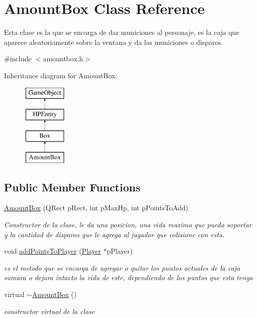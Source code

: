 \hypertarget{class_amount_box}{\section{Amount\-Box Class Reference}
\label{class_amount_box}
}


Esta clase es la que se encarga de dar municiones al personaje, es la caja que aparece aleatoriamente sobre la ventana y da las municiones o disparos.  




{\ttfamily \#include $<$amountbox.\-h$>$}

Inheritance diagram for Amount\-Box\-:\begin{figure}[H]
\begin{center}
\leavevmode
\includegraphics[height=4.000000cm]{class_amount_box}
\end{center}
\end{figure}
\subsection*{Public Member Functions}
\begin{DoxyCompactItemize}
\item 
\hyperlink{class_amount_box_a19f89bb62420a75212487fd191f256c4}{Amount\-Box} (Q\-Rect p\-Rect, int p\-Max\-Hp, int p\-Points\-To\-Add)
\begin{DoxyCompactList}\small\item\em Constructor de la clase, le da una posicion, una vida maxima que pueda soportar y la cantidad de disparos que le agrega al jugador que colisione con esta. \end{DoxyCompactList}\item 
void \hyperlink{class_amount_box_a006ae7739b2e6dbbb19c0a2a09936a71}{add\-Points\-To\-Player} (\hyperlink{class_player}{Player} $\ast$p\-Player)
\begin{DoxyCompactList}\small\item\em es el metodo que se encarga de agregar o quitar los puntos actuales de la caja sumara o dejara intacto la vida de este, dependiendo de los puntos que esta tenga \end{DoxyCompactList}\item 
\hypertarget{class_amount_box_a4d6ec95818bed923b6c19e1df6b50db8}{virtual \hyperlink{class_amount_box_a4d6ec95818bed923b6c19e1df6b50db8}{$\sim$\-Amount\-Box} ()}\label{class_amount_box_a4d6ec95818bed923b6c19e1df6b50db8}

\begin{DoxyCompactList}\small\item\em constructor virtual de la clase \end{DoxyCompactList}\end{DoxyCompactItemize}
